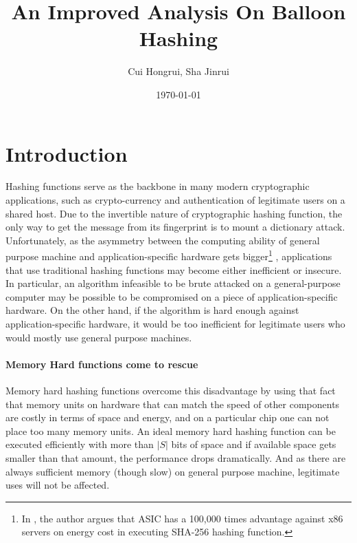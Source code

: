\documentclass[a4paper]{article}
\author{Cui Hongrui, Sha Jinrui}
\date{\today}
\title{An Improved Analysis On Balloon Hashing}
\begin{document}
\maketitle
\section{Introduction}

Hashing functions serve as the backbone in many modern cryptographic applications, such as crypto-currency and
authentication of legitimate users on a shared host. Due to the invertible nature of cryptographic hashing function,
the only way to get the message %
from its fingerprint is to mount a dictionary attack. %
Unfortunately, as the asymmetry between the computing ability
of general purpose machine and application-specific hardware gets bigger\footnote{In \cite{corrigan2016balloon}, the author
argues that ASIC has a 100,000 times advantage against x86 servers on energy cost in executing SHA-256 hashing function.}
, applications that use traditional hashing
functions may become either inefficient or insecure. In particular, an algorithm infeasible to be brute attacked
on a general-purpose computer may be
possible to be compromised on a piece of application-specific hardware. On the other hand, if the algorithm is hard
enough against application-specific hardware, it would be too inefficient for legitimate users who would mostly use
general purpose machines.

\paragraph{Memory Hard functions come to rescue}
Memory hard hashing functions overcome this disadvantage by using that fact that memory units on hardware that can
match the speed of other components are costly in terms of space and energy, and on a particular chip one can not
place too many memory units. An ideal memory hard hashing function can be executed efficiently with more than $|S|$
bits of space and if available space gets smaller than that amount, the performance drops dramatically. And as
there are always sufficient memory (though slow) on general purpose machine, legitimate uses will not be affected.
\end{document}
